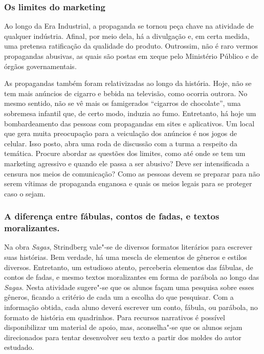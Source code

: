 \documentclass[12pt]{extarticle}
\begin{document}
\subsubsection{Os limites do marketing}


Ao longo da Era Industrial, a propaganda se tornou peça chave na
atividade de qualquer indústria. Afinal, por meio dela, há a
divulgação e, em certa medida, uma pretensa ratificação da qualidade
do produto. Outrossim, não é raro vermos propagandas abusivas, as
quais são postas em xeque pelo Ministério Público e de órgãos
governamentais. 

As propagandas também foram relativizadas ao longo da
história. Hoje, não se tem mais anúncios de cigarro e bebida na
televisão, como ocorria outrora. No mesmo sentido, não se vê mais os
famigerados ``cigarros de chocolate'', uma sobremesa infantil que, de
certo modo, induzia ao fumo. Entretanto, há hoje um bombardeamento das
pessoas com propagandas em sites e aplicativos. Um local que gera
muita preocupação para a veiculação dos anúncios é nos jogos de
celular. Isso posto, abra uma roda de discussão com a turma a respeito
da temática. Procure abordar as questões dos limites, como até onde se
tem um marketing agressivo e quando ele passa a ser abusivo? Deve ser
intensificada a censura nos meios de comunicação? Como as pessoas
devem se preparar para não serem vítimas de propaganda enganosa e
quais os meios legais para se proteger caso o sejam.

\subsubsection{A diferença entre fábulas, contos de fadas, e
textos moralizantes.}


Na obra \emph{Sagas}, Strindberg vale"-se de diversos formatos
literários para escrever suas histórias. Bem verdade, há uma mescla de
elementos de gêneros e estilos diversos. Entretanto, um estudioso
atento, perceberia elementos das fábulas, de contos de fadas, e mesmo
textos moralizantes em forma de parábola ao longo das \emph{Sagas}.
Nesta atividade sugere"-se que os alunos façam uma pesquisa sobre esses
gêneros, ficando a critério de cada um a escolha do que pesquisar. Com
a informação obtida, cada aluno deverá escrever um conto, fábula, ou
parábola, no formato de história em quadrinhos. Para recursos
narrativos é possível disponibilizar um material de apoio, mas,
aconselha"-se que os alunos sejam direcionados para tentar desenvolver
seu texto a partir dos moldes do autor estudado.
\end{document}
